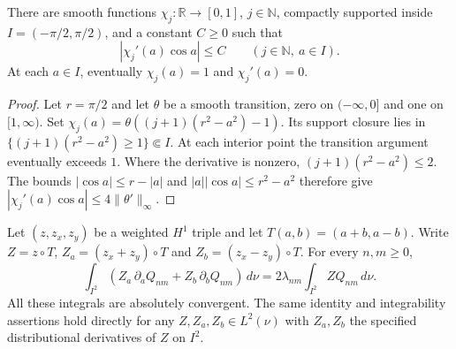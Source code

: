 \begin{lemma}
\label{lem:zonal-cutoffs}
\leanok
There are smooth functions $\chi_j:\mathbb R\to[0,1]$,
$j\in\mathbb N$, compactly supported inside $I=(-\pi/2,\pi/2)$,
and a constant $C\ge0$ such that
\[
 |\chi_j'(a)\cos a|\le C\qquad(j\in\mathbb N,\ a\in I).
\]
At each $a\in I$, eventually $\chi_j(a)=1$ and $\chi_j'(a)=0$.
\end{lemma}

\begin{proof}
\leanok
Let $r=\pi/2$ and let $\theta$ be a smooth transition, zero on $(-\infty,0]$
and one on $[1,\infty)$. Set
$\chi_j(a)=\theta((j+1)(r^2-a^2)-1)$.
Its support closure lies in $\{(j+1)(r^2-a^2)\ge1\}\Subset I$.
At each interior point the transition argument eventually exceeds $1$.
Where the derivative is nonzero, $(j+1)(r^2-a^2)\le2$.
The bounds $|\cos a|\le r-|a|$ and
$|a||\cos a|\le r^2-a^2$ therefore give
$|\chi_j'(a)\cos a|\le4\|\theta'\|_\infty$.
\end{proof}

\begin{lemma}
\label{lem:zonal-weak-pairing}
\leanok
Let $(z,z_x,z_y)$ be a weighted $H^1$ triple and let $T(a,b)=(a+b,a-b)$.
Write $Z=z\circ T$, $Z_a=(z_x+z_y)\circ T$ and
$Z_b=(z_x-z_y)\circ T$. For every $n,m\ge0$,
\[
 \int_{I^2}(Z_a\,\partial_aQ_{nm}+Z_b\,\partial_bQ_{nm})\,d\nu
   =2\lambda_{nm}\int_{I^2}ZQ_{nm}\,d\nu .
\]
All these integrals are absolutely convergent.
The same identity and integrability assertions hold directly for any
$Z,Z_a,Z_b\in L^2(\nu)$ with $Z_a,Z_b$ the specified distributional derivatives
of $Z$ on $I^2$.
\end{lemma}

